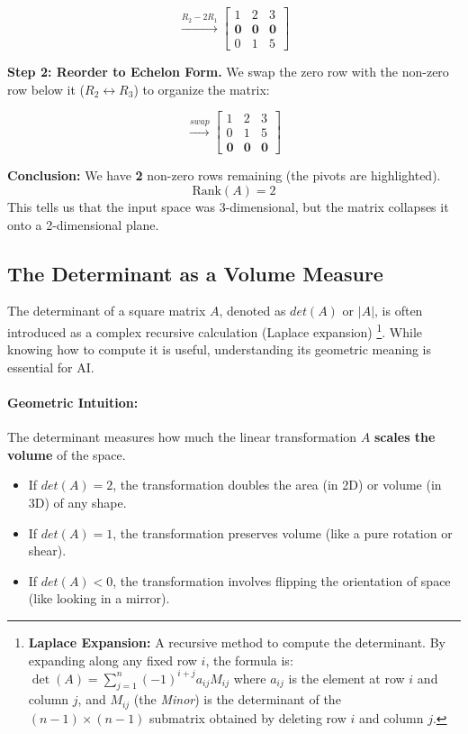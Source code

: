 \begin{equation*}
\xrightarrow{R_2 - 2R_1}
\begin{bmatrix}
1 & 2 & 3 \\
\mathbf{0} & \mathbf{0} & \mathbf{0} \\
0 & 1 & 5
\end{bmatrix}
\end{equation*}

\textbf{Step 2: Reorder to Echelon Form.}
We swap the zero row with the non-zero row below it ($R_2 \leftrightarrow R_3$) to organize the matrix:

\begin{equation*}
\xrightarrow{swap}
\begin{bmatrix}
1 & 2 & 3 \\
0 & 1 & 5 \\
\mathbf{0} & \mathbf{0} & \mathbf{0}
\end{bmatrix}
\end{equation*}

\textbf{Conclusion:}
We have \textbf{2} non-zero rows remaining (the pivots are highlighted).
\[
\text{Rank}(A) = 2
\]
This tells us that the input space was 3-dimensional, but the matrix collapses it onto a 2-dimensional plane.

\subsection{The Determinant as a Volume Measure}

The determinant of a square matrix $A$, denoted as $det(A)$ or $|A|$, is often introduced as a complex recursive calculation (Laplace expansion) \footnote{\textbf{Laplace Expansion:} A recursive method to compute the determinant. By expanding along any fixed row $i$, the formula is:
$ \det(A) = \sum_{j=1}^{n} (-1)^{i+j} a_{ij} M_{ij} $
where $a_{ij}$ is the element at row $i$ and column $j$, and $M_{ij}$ (the \textit{Minor}) is the determinant of the $(n-1) \times (n-1)$ submatrix obtained by deleting row $i$ and column $j$.}. While knowing how to compute it is useful, understanding its geometric meaning is essential for AI.

\paragraph{Geometric Intuition:}
The determinant measures how much the linear transformation $A$ \textbf{scales the volume} of the space.
\begin{itemize}
    \item If $det(A) = 2$, the transformation doubles the area (in 2D) or volume (in 3D) of any shape.
    \item If $det(A) = 1$, the transformation preserves volume (like a pure rotation or shear).
    \item If $det(A) < 0$, the transformation involves flipping the orientation of space (like looking in a mirror).
\end{itemize}

